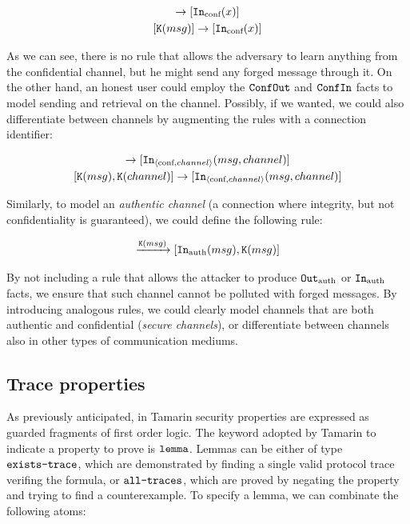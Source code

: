 \documentclass{article}
\newcommand{\mono}[1]{\textrm{\tt #1}}
\begin{document}
\begin{gather*}
    [ \mono{Out}_{\textrm{conf}}(msg)] \to [ \mono{In}_{\textrm{conf}}(x) ]\\
    [ \mono{K}(msg) ] \to [ \mono{In}_{\textrm{conf}}(x) ]
\end{gather*}

As we can see, there is no rule that allows the adversary to learn anything from the confidential channel, but he might send any forged message through it. On the other hand, an honest user could employ the $\mono{ConfOut}$ and $\mono{ConfIn}$ facts to model sending and retrieval on the channel. Possibly, if we wanted, we could also differentiate between channels by augmenting the rules with a connection identifier:

\begin{gather*}
    [\mono{Out}_{\langle \textrm{conf}, channel \rangle}(msg, channel)] \to [\mono{In}_{\langle \textrm{conf}, channel \rangle}(msg, channel)]\\
    [\mono{K}(msg), \mono{K}(channel)] \to [\mono{In}_{\langle \textrm{conf}, channel \rangle}(msg, channel)]
\end{gather*}

Similarly, to model an \textit{authentic channel} (a connection where integrity, but not confidentiality is guaranteed), we could define the following rule:

\begin{equation*}
    [\mono{Out}_{\textrm{auth}}(msg)] \xrightarrow{\mono{K}(msg)} [\mono{In}_{\textrm{auth}}(msg), \mono{K}(msg)]
\end{equation*}

By not including a rule that allows the attacker to produce $\mono{Out}_\textrm{auth}$ or $\mono{In}_\textrm{auth}$ facts, we ensure that such channel cannot be polluted with forged messages. By introducing analogous rules, we could clearly model channels that are both authentic and confidential (\textit{secure channels}), or differentiate between channels also in other types of communication mediums.

\subsection{Trace properties}\label{subsec:TraceProperties}

As previously anticipated, in Tamarin security properties are expressed as guarded fragments of first order logic. The keyword adopted by Tamarin to indicate a property to prove is $\mono{lemma}$. Lemmas can be either of type $\mono{exists-trace}$, which are demonstrated by finding a single valid protocol trace verifing the formula, or $\mono{all-traces}$, which are proved by negating the property and trying to find a counterexample. To specify a lemma, we can combinate the following atoms:
\end{document}
